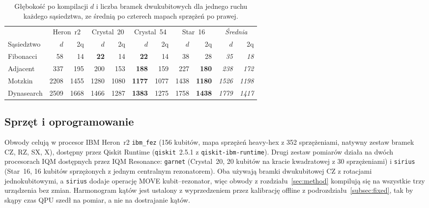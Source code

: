 \documentclass[11pt,a4paper]{article}
\begin{document}
\begin{table}[t]
\centering
\caption{Głębokość po kompilacji $d$ i liczba bramek dwukubitowych dla jednego
  ruchu każdego sąsiedztwa, ze średnią po czterech mapach sprzężeń po prawej.}
\label{tab:depth}
\footnotesize
\setlength{\tabcolsep}{3pt}
\begin{tabular*}{\textwidth}{@{\extracolsep{\fill}}lrrrrrrrr@{\hspace{1.2em}}rr@{}}
\toprule
& \multicolumn{2}{c}{Heron~r2} & \multicolumn{2}{c}{Crystal~20}
& \multicolumn{2}{c}{Crystal~54} & \multicolumn{2}{c}{Star~16}
& \multicolumn{2}{c}{\emph{Średnia}} \\
\cmidrule(lr){2-3}\cmidrule(lr){4-5}\cmidrule(lr){6-7}\cmidrule(lr){8-9}\cmidrule(lr){10-11}
Sąsiedztwo & $d$ & 2q & $d$ & 2q & $d$ & 2q & $d$ & 2q & $d$ & 2q \\
\midrule
Fibonacci  & 58   & 14   & \textbf{22}   & 14   & \textbf{22}   & 14   & 38   & 28            & \emph{35}   & \emph{18} \\
Adjacent   & 337  & 195  & 200  & 153  & \textbf{188}  & 159  & 227  & \textbf{180}  & \emph{238}  & \emph{172} \\
Motzkin    & 2208 & 1455 & 1280 & 1080 & \textbf{1177} & 1077 & 1438 & \textbf{1180} & \emph{1526} & \emph{1198} \\
Dynasearch & 2509 & 1668 & 1466 & 1287 & \textbf{1383} & 1275 & 1758 & \textbf{1438} & \emph{1779} & \emph{1417} \\
\bottomrule
\end{tabular*}
\end{table}

\subsection{Sprzęt i oprogramowanie}
\label{subsec:hw}
Obwody celują w procesor IBM Heron~r2 \texttt{ibm\_fez} (156 kubitów, mapa
sprzężeń heavy-hex z 352 sprzężeniami, natywny zestaw bramek CZ, RZ, SX, X),
dostępny przez Qiskit Runtime (\texttt{qiskit}~2.5.1 z
\texttt{qiskit-ibm-runtime}). Drugi zestaw pomiarów działa na dwóch
procesorach IQM dostępnych przez IQM Resonance: \texttt{garnet} (Crystal~20,
20 kubitów na kracie kwadratowej z 30 sprzężeniami) i \texttt{sirius}
(Star~16, 16 kubitów sprzężonych z jednym centralnym rezonatorem). Oba używają
bramki dwukubitowej CZ z rotacjami jednokubitowymi, a \texttt{sirius} dodaje
operację MOVE kubit--rezonator, więc obwody z rozdziału~\ref{sec:method}
kompilują się na wszystkie trzy urządzenia bez zmian. Harmonogram kątów jest
ustalony z wyprzedzeniem przez kalibrację offline
z podrozdziału~\ref{subsec:fixed}, tak by skąpy czas QPU szedł na pomiar,
a nie na dostrajanie kątów.
\end{document}
